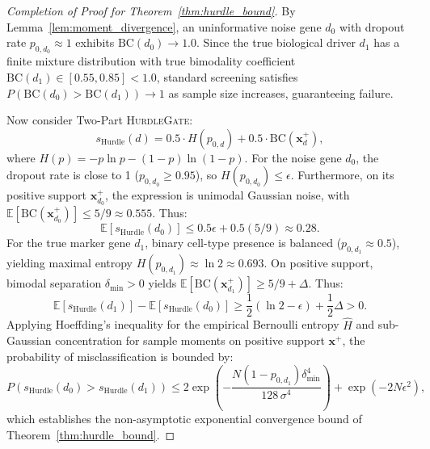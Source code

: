 \begin{proof}[Completion of Proof for Theorem~\ref{thm:hurdle_bound}]
By Lemma~\ref{lem:moment_divergence}, an uninformative noise gene $d_0$ with dropout rate $p_{0, d_0} \approx 1$ exhibits $\text{BC}(d_0) \to 1.0$. Since the true biological driver $d_1$ has a finite mixture distribution with true bimodality coefficient $\text{BC}(d_1) \in [0.55, 0.85] < 1.0$, standard screening satisfies $P(\text{BC}(d_0) > \text{BC}(d_1)) \to 1$ as sample size increases, guaranteeing failure.

Now consider Two-Part \textsc{HurdleGate}:
\begin{equation}
    s_{\mathrm{Hurdle}}(d) = 0.5 \cdot H(p_{0, d}) + 0.5 \cdot \text{BC}(\mathbf{x}_d^+),
\end{equation}
where $H(p) = -p \ln p - (1-p) \ln(1-p)$.
For the noise gene $d_0$, the dropout rate is close to 1 ($p_{0, d_0} \ge 0.95$), so $H(p_{0, d_0}) \le \epsilon$. Furthermore, on its positive support $\mathbf{x}_{d_0}^+$, the expression is unimodal Gaussian noise, with $\mathbb{E}[\text{BC}(\mathbf{x}_{d_0}^+)] \le 5/9 \approx 0.555$. Thus:
\begin{equation}
    \mathbb{E}[s_{\mathrm{Hurdle}}(d_0)] \le 0.5 \epsilon + 0.5(5/9) \approx 0.28.
\end{equation}
For the true marker gene $d_1$, binary cell-type presence is balanced ($p_{0, d_1} \approx 0.5$), yielding maximal entropy $H(p_{0, d_1}) \approx \ln 2 \approx 0.693$. On positive support, bimodal separation $\delta_{\min} > 0$ yields $\mathbb{E}[\text{BC}(\mathbf{x}_{d_1}^+)] \ge 5/9 + \Delta$. Thus:
\begin{equation}
    \mathbb{E}[s_{\mathrm{Hurdle}}(d_1)] - \mathbb{E}[s_{\mathrm{Hurdle}}(d_0)] \ge \frac{1}{2}\left(\ln 2 - \epsilon\right) + \frac{1}{2}\Delta > 0.
\end{equation}
Applying Hoeffding's inequality for the empirical Bernoulli entropy $\hat{H}$ and sub-Gaussian concentration for sample moments on positive support $\mathbf{x}^+$, the probability of misclassification is bounded by:
\begin{equation}
    P\left(s_{\mathrm{Hurdle}}(d_0) > s_{\mathrm{Hurdle}}(d_1)\right) \le 2 \exp\left( - \frac{N (1 - p_{0, d_1}) \delta_{\min}^4}{128 \, \sigma^4} \right) + \exp(-2 N \epsilon^2),
\end{equation}
which establishes the non-asymptotic exponential convergence bound of Theorem~\ref{thm:hurdle_bound}.
\end{proof}
